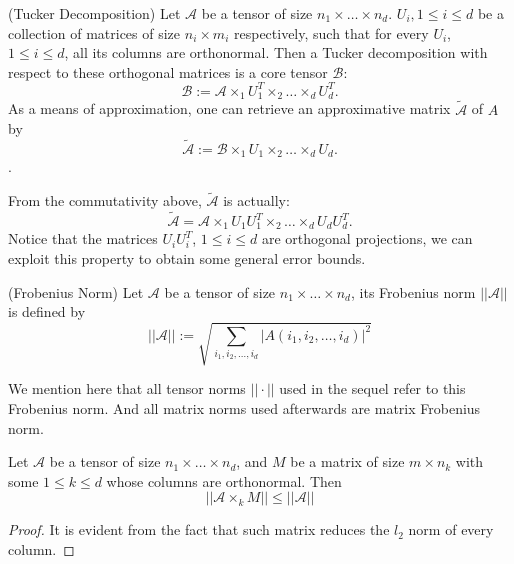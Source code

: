 \documentclass[12pt]{article}
\begin{document}
\begin{mydef}{(Tucker Decomposition)}
\label{tuckerd}
Let $\mathcal{A}$ be a tensor of size $n_1 \times \dots \times n_d$. $U_i, 1 \leq i \leq d$ be a collection of matrices of size $n_i \times m_i$ respectively, such that for every $U_i$, $1 \leq i \leq d$, all its columns are orthonormal. Then a Tucker decomposition with respect to these orthogonal matrices is a core tensor $\mathcal{B}$:
$$ \mathcal{B} := \mathcal{A} \times_1 U_1^T \times_2 \dots \times_d U_d^T.$$
As a means of approximation, one can retrieve an approximative matrix $\tilde{\mathcal{A}}$ of $A$ by
$$ \tilde{\mathcal{A}} :=  \mathcal{B} \times_1 U_1 \times_2 \dots \times_d U_d.$$. 
\end{mydef}


From the commutativity above, $\tilde{\mathcal{A}}$ is actually:
$$ \tilde{\mathcal{A}} = \mathcal{A} \times_1 U_1 U_1^T \times_2 \dots \times_d U_dU_d^T.$$
Notice that the matrices $U_iU_i^T$, $1 \leq i \leq d$ are orthogonal projections, we can exploit this property to obtain some general error bounds.

\begin{mydef}{(Frobenius Norm)}
Let $\mathcal{A}$ be a tensor of size $n_1 \times \dots \times n_d$, its Frobenius norm $|| \mathcal{A}||$ is defined by
$$|| \mathcal{A}|| := \sqrt{ \sum_{i_1, i_2, \dots, i_d} |A(i_1, i_2, \dots, i_d)| ^ 2 }$$
\end{mydef}

We mention here that all tensor norms $|| \cdot || $ used in the sequel refer to this Frobenius norm. And all matrix norms used afterwards are matrix Frobenius norm.

\begin{myprop}
Let $\mathcal{A}$ be a tensor of size $n_1 \times \dots \times n_d$, and $M$ be a matrix of size $m \times n_k$ with some $1 \leq k \leq d$ whose columns are orthonormal. Then 
$$ || \mathcal{A} \times_k M || \leq || \mathcal{A} || $$
\end{myprop}

\begin{proof}
It is evident from the fact that such matrix reduces the $l_2$ norm of every column.
\end{proof}
\end{document}
